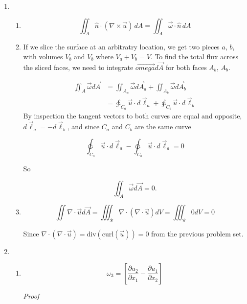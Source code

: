 \documentclass[11pt,twoside]{article}
\newcommand{\p}[2]{\frac{\partial#1}{\partial#2}}
\newcommand{\vect}[1]{\vec{#1}}
\newcommand{\grad}{\nabla}
\newcommand{\cross}{\times}
\newcommand{\curl}{\mbox{curl}}
\newcommand{\divf}{\mbox{div}}
\newcommand{\lint}{\ointctrclockwise}
\begin{document}
\begin{enumerate}
\begin{enumerate}
\end{enumerate}

%
%
\item
\begin{enumerate}
\item
$$\iint_A \hat{n}\cdot(\grad\cross\vect{u})\,dA = \iint_A\vect{\omega}\cdot\hat{n}\,dA$$


\item If we slice the surface at an arbitratry location, we get two pieces $a$, $b$, with volumes $V_b$ and $V_b$ where $V_a+V_b=V$.  To find the total flux across the sliced faces, we need to integrate $\vect{omega}d\vect{A}$ for both faces $A_b$, $A_b$. 

\begin{align*}
\iint_A\vect{\omega}d\vect{A} &= \iint_{A_a}\vect{\omega}d\vect{A}_a + \iint_{A_b}\vect{\omega}d\vect{A}_b\\
&=\lint_{C_a}\vect{u}\cdot d\vect{\ell}_{a} + \lint_{C_b}\vect{u}\cdot d\vect{\ell}_{b}
\end{align*}
By inspection the tangent vectors to both curves are equal and opposite, $d\vect{\ell}_{a} = -d\vect{\ell}_{b}$, and since $C_a$ and $C_b$ are the same curve 

$$\lint_{C_a}\vect{u}\cdot d\vect{\ell}_{a} - \lint_{C_b}\vect{u}\cdot d\vect{\ell}_{a} = 0 $$

So 

$$\iint_A\vect{\omega}d\vect{A} = 0 .$$

\item 
$$\iint \grad\cdot\vect{u}d\vect{A} = \iiint_{\mathcal{R}}\grad\cdot(\grad\cdot\vect{u})dV = \iiint_{\mathcal{R}}0dV = 0$$

Since $\grad\cdot(\grad\cdot\vect{u}) = \divf(\curl(\vect{u})) = 0$ from the previous problem set. 

\end{enumerate}


%
%
\item 
\begin{enumerate}

\item 
$$\omega_3=\left[\p{u_2}{x_1}-\p{u_1}{x_2}\right]$$

\textit{Proof}


\end{enumerate}
\end{enumerate}
\end{document}
